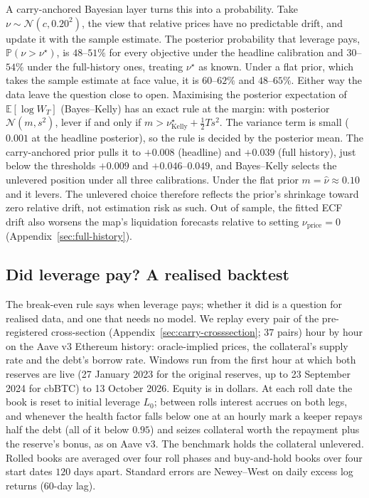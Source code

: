 \documentclass[11pt]{article}
\newcommand{\E}{\mathbb{E}}
\renewcommand{\P}{\mathbb{P}}
\theoremstyle{plain}
\theoremstyle{definition}
\theoremstyle{remark}
\begin{document}
A carry-anchored Bayesian layer turns this into a probability. Take $\nu\sim\mathcal N(c,0.20^2)$,
the view that relative prices have no predictable drift, and update it with the sample estimate.
The posterior probability that leverage pays, $\P(\nu>\nu^\star)$, is $48$--$51\%$ for every objective
under the headline calibration and $30$--$54\%$ under the full-history ones, treating $\nu^\star$ as
known. Under a flat prior, which takes the sample estimate at face value, it is $60$--$62\%$ and
$48$--$65\%$. Either way the data leave the question close to open. Maximising the posterior
expectation of $\E[\log W_T]$ (Bayes--Kelly) has an exact rule at the margin: with posterior
$\mathcal N(m,s^2)$, lever if and only if $m>\nu^\star_{\mathrm{Kelly}}+\tfrac12Ts^2$. The variance
term is small ($0.001$ at the headline posterior), so the rule is decided by the posterior mean. The
carry-anchored prior pulls it to $+0.008$ (headline) and $+0.039$ (full history), just below the
thresholds $+0.009$ and $+0.046$--$0.049$, and Bayes--Kelly selects the unlevered position under all
three calibrations. Under the flat prior $m=\hat\nu\approx0.10$ and it levers. The unlevered choice
therefore reflects the prior's shrinkage toward zero relative drift, not estimation risk as such. Out of sample, the fitted ECF drift also worsens the map's
liquidation forecasts relative to setting $\nu_{\mathrm{price}}=0$ (Appendix~\ref{sec:full-history}).

\subsection{Did leverage pay? A realised backtest}\label{sec:realised}
The break-even rule says when leverage pays; whether it did is a question for realised data, and
one that needs no model. We replay every pair of the pre-registered cross-section
(Appendix~\ref{sec:carry-crosssection}; $37$ pairs) hour by hour on the Aave v3 Ethereum history: oracle-implied prices, the collateral's
supply rate and the debt's borrow rate. Windows run from the first hour at which both reserves are
live (27 January 2023 for the original reserves, up to 23 September 2024 for cbBTC) to 13 October
2026. Equity is in dollars. At each roll date the book is reset to initial leverage $L_0$; between
rolls interest accrues on both legs, and whenever the health factor falls below one at an hourly
mark a keeper repays half the debt (all of it below $0.95$) and seizes collateral worth the repayment
plus the reserve's bonus, as on Aave v3. The benchmark holds the collateral unlevered. Rolled books
are averaged over four roll phases and buy-and-hold books over four start dates $120$ days apart.
Standard errors are Newey--West on daily excess log returns ($60$-day lag).
\end{document}
